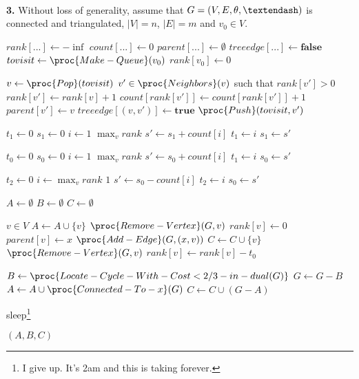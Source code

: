 \documentclass{article}
\begin{document}
\paragraph{} \textbf{3.}
Without loss of generality, assume that $G=(V, E, \theta, \textendash)$ is connected and triangulated, $|V| = n$, $|E| = m$ and  $v_0 \in V$.

\begin{footnotesize}
\begin{codebox}

\li $rank[...] \gets -\inf$
\li $count[...] \gets 0$
\li $parent[...] \gets \emptyset$
\li $treeedge[...] \gets \textbf{false}$
\li $tovisit \gets \proc{Make-Queue}(v_0)$
\li $rank[v_0] \gets 0$


\li {}
\li 	\Do $v \gets \proc{Pop}(tovisit)$
\li		\For {} $v' \in \proc{Neighbors}(v)$ such that $rank[v'] > 0$
\li			\Do $rank[v'] \gets rank[v]+1$
\li				$count[rank[v']] \gets count[rank[v']]+1$
\li				$parent[v'] \gets v$
\li				$treeedge[(v,v')] \gets \textbf{true}$
\li				$\proc{Push}(tovisit, v')$
			\End
		\End

\li $t_1 \gets 0$
\li $s_1 \gets 0$
\li \For $i \gets 1$  $\max_v{rank}$
\li		\Do $s' \gets s_1 + count[i]$
\li		{}
\li			\Then $t_1 \gets i$
\li			{}
			\End
\li			$s_1 \gets s'$
		\End

\li $t_0 \gets 0$
\li $s_0 \gets 0$
\li \For $i \gets 1$  $\max_v{rank}$
\li		\Do $s' \gets s_0 + count[i]$
\li		{}
\li			\Then $t_1 \gets i$
			\End
\li			$s_0 \gets s'$
		\End

\li $t_2 \gets 0$
\li \For $i \gets \max_v{rank}$  $1$
\li		\Do $s' \gets s_0 - count[i]$
\li		{}
\li			\Then $t_2 \gets i$
			\End
\li			$s_0 \gets s'$
		\End

\li $A \gets \emptyset$
\li $B \gets \emptyset$
\li $C \gets \emptyset$

\li \For {} $v \in V$
\li		\Do {}
\li			\Then $A \gets A \cup \{ v \}$
\li			$\proc{Remove-Vertex}(G, v)$
\li			{}
\li			\Then $rank[v] \gets 0$
\li			$parent[v] \gets x$
\li			$\proc{Add-Edge}(G, (x,v))$
\li			{}
\li			\Then $C \gets C \cup \{ v \}$
\li			$\proc{Remove-Vertex}(G, v)$
\li			\Else
\li			$rank[v] \gets rank[v] - t_0$	
			\End
		\End
		\End

\li $B \gets \proc{Locate-Cycle-With-Cost<2/3-in-dual(G)}$
\li $G \gets G - B$
\li $A \gets A \cup \proc{Connected-To-x}(G)$
\li	$C \gets C \cup (G - A)$

\li {} sleep\footnote{I give up.  It's 2am and this is taking forever.}

\li \Return $(A,B,C)$

\end{codebox}
\end{footnotesize}
\end{document}
